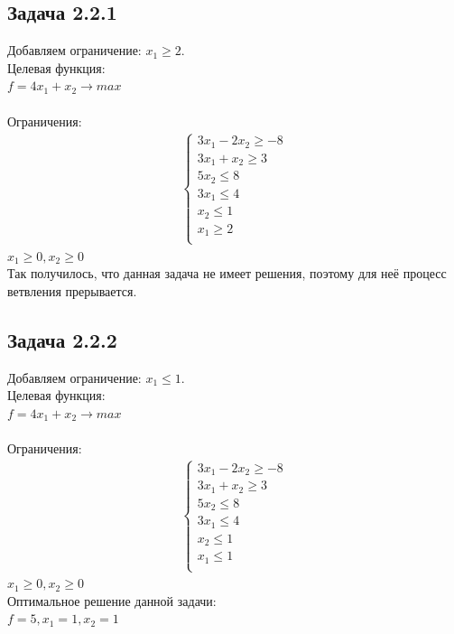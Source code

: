 \documentclass[14pt,a4paper,fleqn]{extarticle}
\begin{document}
	\subsection*{Задача 2.2.1}
	Добавляем ограничение: $x_1 \geq 2$.\\
	
	Целевая функция:\\
	$f = 4x_1+x_2 \longrightarrow max$\\\\
	Ограничения:
	\begin{align*}
		\begin{cases}
			3x_1 - 2x_2 \geq -8\\
			3x_1 + x_2 \geq 3\\
			5 x_2 \leq 8\\
			3 x_1 \leq 4\\
			x_2 \leq 1\\
			x_1 \geq 2\\
		\end{cases}
	\end{align*}
	$x_1 \geq 0, x_2 \geq 0$\\
	
	Так получилось, что данная задача не имеет решения, поэтому для неё процесс ветвления прерывается.\\
	\newpage
	\subsection*{Задача 2.2.2}
	Добавляем ограничение: $x_1 \leq 1$.\\
	
	Целевая функция:\\
	$f = 4x_1+x_2 \longrightarrow max$\\\\
	Ограничения:
	\begin{align*}
		\begin{cases}
			3x_1 - 2x_2 \geq -8\\
			3x_1 + x_2 \geq 3\\
			5 x_2 \leq 8\\
			3 x_1 \leq 4\\
			x_2 \leq 1\\
			x_1 \leq 1\\
		\end{cases}
	\end{align*}
	$x_1 \geq 0, x_2 \geq 0$\\
	
	Оптимальное решение данной задачи:\\
	\underline{$f = 5, x_1 = 1, x_2 = 1$}\\
	
\end{document}
